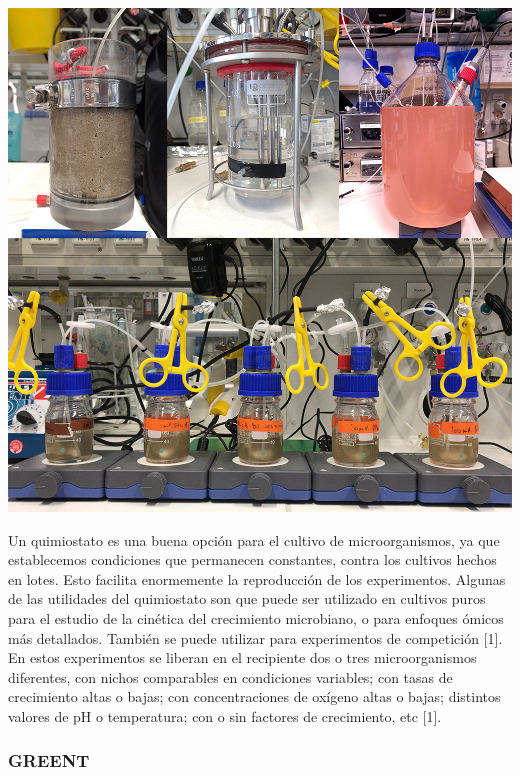 \documentclass[letterpaper]{article}
\begin{document}
{{            \begin{center}
                \includegraphics[scale=0.2]{Chemostat.jpg}
            \end{center}

            \normalsize{Un quimiostato es una buena opción para el cultivo de microorganismos, ya que establecemos condiciones que permanecen constantes, contra los cultivos hechos en lotes. Esto facilita enormemente la reproducción de los experimentos. Algunas de las utilidades del quimiostato son que puede ser utilizado en cultivos puros para el estudio de la cinética del crecimiento microbiano, o para enfoques ómicos más detallados. También se puede utilizar para experimentos de competición [1].}\\
            
            \normalsize{En estos experimentos se liberan en el recipiente dos o tres microorganismos diferentes, con nichos comparables en condiciones variables; con tasas de crecimiento altas o bajas; con concentraciones de oxígeno altas o bajas; distintos valores de pH o temperatura; con o sin factores de crecimiento, etc [1].}

            \subsubsection{GREENT}{

}}}
\end{document}

